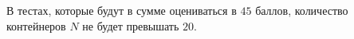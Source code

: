 В тестах, которые будут в сумме оцениваться в $45$ баллов, количество контейнеров $N$ не будет
превышать $20$.